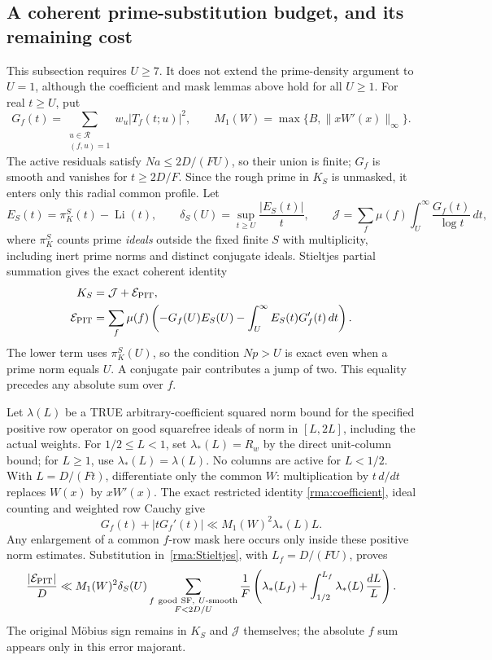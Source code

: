 \documentclass[11pt]{article}
\theoremstyle{definition}\newtheorem{definition}[theorem]{Definition}
\theoremstyle{remark}\newtheorem{remark}[theorem]{Remark}
\begin{document}
\subsection{A coherent prime-substitution budget, and its remaining cost}
This subsection requires $U\ge7$. It does not extend the prime-density
argument to $U=1$, although the coefficient and mask lemmas above hold
for all $U\ge1$. For real $t\ge U$, put
\[
 G_f(t)=\sum_{\substack{u\in\mathcal R\\(f,u)=1}}
                      w_u|T_f(t;u)|^2,
 \qquad M_1(W)=\max\{B,\|xW'(x)\|_\infty\}.
\]
The active residuals satisfy $Na\le2D/(FU)$, so their union is finite;
$G_f$ is smooth and vanishes for $t\ge2D/F$. Since the rough prime in
$K_S$ is unmasked, it enters only this radial common profile. Let
\[
 E_S(t)=\pi_K^S(t)-\operatorname{Li}(t),\qquad
 \delta_S(U)=\sup_{t\ge U}\frac{|E_S(t)|}{t},
 \qquad
 \mathcal J=\sum_f\mu(f)\int_U^\infty\frac{G_f(t)}{\log t}\,dt,
\]
where $\pi_K^S$ counts prime \emph{ideals} outside the fixed finite $S$ with
multiplicity, including inert prime norms and distinct conjugate ideals. Stieltjes partial
summation gives the exact coherent identity
\begin{equation}\label{rma:Stieltjes}
 \begin{aligned}
 K_S&=\mathcal J+\mathcal E_{\rm PIT},\\
 \mathcal E_{\rm PIT}
 &=\sum_f\mu(f)\left(-G_f(U)E_S(U)
          -\int_U^\infty E_S(t)G_f'(t)\,dt\right).
 \end{aligned}
\end{equation}
The lower term uses $\pi_K^S(U)$, so the condition $Np>U$ is exact even
when a prime norm equals $U$. A conjugate pair contributes a jump of
two. This equality precedes any absolute sum over $f$.

Let $\lambda(L)$ be a TRUE arbitrary-coefficient squared norm bound for
the specified positive row operator on good squarefree ideals of norm
in $[L,2L]$, including the actual weights. For $1/2\le L<1$, set
$\lambda_*(L)=R_w$ by the direct unit-column bound; for $L\ge1$, use
$\lambda_*(L)=\lambda(L)$. No columns are active for $L<1/2$.
With $L=D/(Ft)$, differentiate only the common $W$: multiplication by
$t\,d/dt$ replaces $W(x)$ by $xW'(x)$. The exact restricted identity
\eqref{rma:coefficient}, ideal counting and weighted row Cauchy give
\[
 G_f(t)+|tG_f'(t)|\ll M_1(W)^2\lambda_*(L)L.
\]
Any enlargement of a common $f$-row mask here occurs only inside these
positive norm estimates. Substitution in~\eqref{rma:Stieltjes}, with
$L_f=D/(FU)$, proves
\begin{equation}\label{rma:PIT-variation}
 \frac{|\mathcal E_{\rm PIT}|}{D}
 \ll M_1(W)^2\delta_S(U)
 \sum_{\substack{f\ \mathrm{good\ SF},\ U\text{-smooth}\\F<2D/U}}
 \frac1F\left(\lambda_*(L_f)
       +\int_{1/2}^{L_f}\lambda_*(L)\,\frac{dL}{L}\right).
\end{equation}
The original M\"obius sign remains in $K_S$ and $\mathcal J$ themselves;
the absolute $f$ sum appears only in this error majorant.
\end{document}
